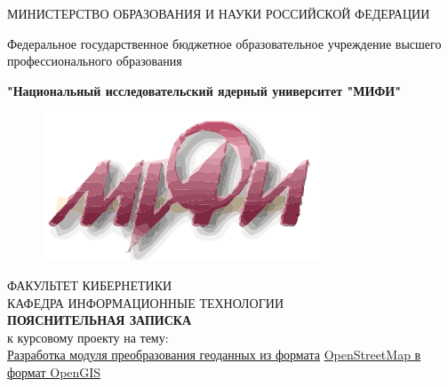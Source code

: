 \documentclass[12pt,a4paper,oneside]{article} %
\begin{document}
\singlespacing %
\pagestyle{empty} %

\newpage
\begin{center}
МИНИСТЕРСТВО ОБРАЗОВАНИЯ И НАУКИ РОССИЙСКОЙ ФЕДЕРАЦИИ

Федеральное государственное бюджетное образовательное учреждение \linebreak
высшего профессионального образования

\textbf{"Национальный исследовательский ядерный университет "МИФИ"}
\\[10pt]

\begin{figure}[h]
\includegraphics[width=0.25\linewidth]{mifi}
\end{figure}

ФАКУЛЬТЕТ КИБЕРНЕТИКИ
\\[15pt]

КАФЕДРА ИНФОРМАЦИОННЫЕ ТЕХНОЛОГИИ
\\[60pt]

\LARGE{\textbf{ПОЯСНИТЕЛЬНАЯ ЗАПИСКА}}
\\[10pt]

\large{к курсовому проекту на тему:}
\\[10pt]

\large{\underline{Разработка модуля преобразования геоданных из формата\hspace{4cm}} \linebreak
\underline{OpenStreetMap в формат OpenGIS\hspace{9,4cm}}}
\\[50pt]
\end{center}
\end{document}
